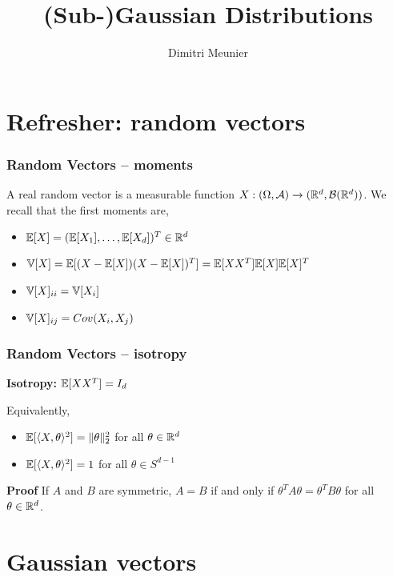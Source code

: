 \documentclass[handout]{beamer} %
\title{(Sub-)Gaussian Distributions}
\author{Dimitri Meunier}
\institute{IIT}
\begin{document}
\maketitle

  \section{Refresher: random vectors}

  \begin{frame}
    \frametitle{Random Vectors -- moments}

    A real random vector is a measurable function $X:(\Omega,\mathcal{A}) \to
    (\mathbb{R}^{d},\mathcal{B}(\mathbb{R}^{d}))$. We recall that the first moments are,

    \begin{itemize}
    \item $\mathbb{E}[X] = (\mathbb{E}[X_1], \ldots, \mathbb{E}[X_d])^T \in \mathbb{R}^{d}$
      \pause
      
    \item $\mathbb{V}[X] = \mathbb{E}[(X-\mathbb{E}[X])(X-\mathbb{E}[X])^T] =  \mathbb{E}[XX^T] \mathbb{E}[X]\mathbb{E}[X]^T$
      \pause
    \item $\mathbb{V}[X]_{ii} = \mathbb{V}[X_i]$
    \item $\mathbb{V}[X]_{ij} = Cov(X_i,X_j)$        
    \end{itemize}
  \end{frame}

  \begin{frame}
    \frametitle{Random Vectors -- isotropy}

    \textbf{Isotropy:}  $\mathbb{E}[XX^T] = I_d$

    \pause

    Equivalently,   

    \begin{itemize}
    \item $\mathbb{E}[\langle X,\theta \rangle^2] = \|\theta\|_2^2$ for all $\theta \in
      \mathbb{R}^{d}$
    \item $\mathbb{E}[\langle X,\theta \rangle^2] = 1$ for all $\theta \in S^{d-1}$
    \end{itemize}

    \textbf{Proof} If $A$ and $B$ are symmetric, $A=B$ if and only if
    $\theta^TA\theta = \theta^TB\theta$ for all $\theta \in \mathbb{R}^{d}$.
  \end{frame}

  \section{Gaussian vectors}
\end{document}
